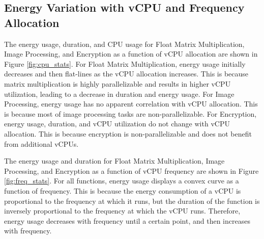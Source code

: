 \documentclass[times, 10pt,twocolumn]{article}
\begin{document}
\subsection{Energy Variation with vCPU and Frequency Allocation}
\label{appendix:energy_variation_vcpu_frequency}
The energy usage, duration, and CPU usage for Float Matrix Multiplication, Image Processing, and Encryption as a function of vCPU allocation are shown in Figure \ref{fig:cpu_stats}. For Float Matrix Multiplication, energy usage initially decreases and then flat-lines as the vCPU allocation increases. This is because matrix multiplication is highly parallelizable and results in higher vCPU utilization, leading to a decrease in duration and energy usage. For Image Processing, energy usage has no apparent correlation with vCPU allocation. This is because most of image processing tasks are non-parallelizable. For Encryption, energy usage, duration, and vCPU utilization do not change with vCPU allocation. This is because encryption is non-parallelizable and does not benefit from additional vCPUs.

The energy usage and duration for Float Matrix Multiplication, Image Processing, and Encryption as a function of vCPU frequency are shown in Figure \ref{fig:freq_stats}. For all functions, energy usage displays a convex curve as a function of frequency. This is because the energy consumption of a vCPU is proportional to the frequency at which it runs, but the duration of the function is inversely proportional to the frequency at which the vCPU runs. Therefore, energy usage decreases with frequency until a certain point, and then increases with frequency.
\end{document}
